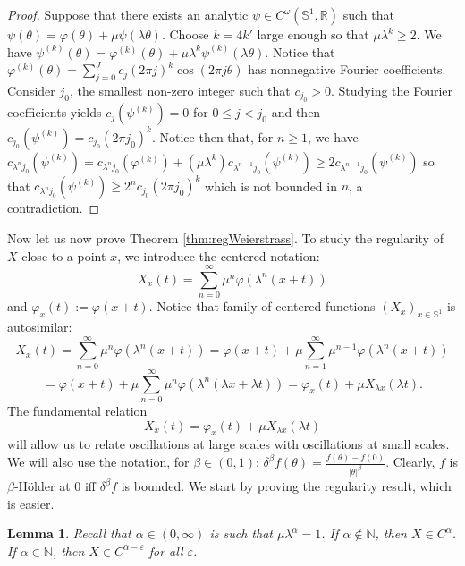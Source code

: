 \documentclass[11pt]{amsart}
\theoremstyle{plain}
\newtheorem{lemma}[theorem]{Lemma}
\theoremstyle{definition}
\numberwithin{equation}{section}
\begin{document}
\begin{proof}
Suppose that there exists an analytic $\psi \in C^\omega(\mathbb{S}^1,\mathbb{R})$ such that $\psi(\theta)=\varphi(\theta)+\mu \psi(\lambda \theta)$. Choose $k=4k'$ large enough so that $\mu \lambda^k \geq 2$. We have $\psi^{(k)}(\theta)=\varphi^{(k)}(\theta)+\mu \lambda^k \psi^{(k)}(\lambda \theta)$. Notice that $\varphi^{(k)}(\theta) = \sum_{j=0}^J c_j (2\pi j)^k \cos(2 \pi j \theta)$ has nonnegative Fourier coefficients. Consider $j_0$, the smallest non-zero integer such that $c_{j_0}>0$. Studying the Fourier coefficients yields $c_{j}(\psi^{(k)}) = 0$ for $0 \leq j<j_0$ and then $c_{j_0}(\psi^{(k)}) = c_{j_0} (2\pi j_0)^k$.
Notice then that, for $n \geq 1$, we have $c_{\lambda^n j_0}(\psi^{(k)}) = c_{\lambda^n j_0}(\varphi^{(k)})+ (\mu \lambda^k) c_{\lambda^{n-1}j_0}(\psi^{(k)}) \geq 2 c_{\lambda^{n-1}j_0}(\psi^{(k)})$
so that $c_{\lambda^n j_0}(\psi^{(k)}) \geq 2^n c_{j_0} (2 \pi j_0)^k$ which is not bounded in $n$, a contradiction.
\end{proof}


Now let us now prove Theorem \ref{thm:regWeierstrass}. To study the regularity of $X$ close to a point $x$, we introduce the centered notation:
$$X_x(t)=\sum_{n=0}^\infty \mu^n \varphi(\lambda^n(x+t))$$
and $\varphi_x(t) := \varphi(x+t)$.
Notice that family of centered functions $(X_x)_{x \in \mathbb{S}^1}$ is autosimilar:
$$X_x(t)=\sum_{n=0}^\infty \mu^n \varphi(\lambda^n(x+t)) = \varphi(x+t) + \mu \sum_{n=1}^\infty \mu^{n-1} \varphi(\lambda^n(x+t)) $$
$$ = \varphi(x+t) + \mu \sum_{n=0}^\infty \mu^{n} \varphi(\lambda^n( \lambda x+ \lambda t)) = \varphi_x(t) + \mu X_{\lambda x}(\lambda t) .$$
The fundamental relation $$ X_x(t) = \varphi_x(t) + \mu X_{\lambda x}(\lambda t)$$
will allow us to relate oscillations at large scales with oscillations at small scales. We will also use the notation, for $\beta \in (0,1)$: $\delta^\beta f(\theta) = \frac{f(\theta)-f(0)}{|\theta|^\beta} $. Clearly, $f$ is $\beta$-Hölder at $0$ iff $\delta^\beta f$ is bounded. We start by proving the regularity result, which is easier.

\begin{lemma}
Recall that $\alpha \in (0,\infty)$ is such that $\mu \lambda^\alpha=1$. If $\alpha \notin \mathbb{N}$, then $X \in C^\alpha$. If $\alpha \in \mathbb{N}$, then $X \in C^{\alpha-\varepsilon}$ for all $\varepsilon$.
\end{lemma}
\end{document}
